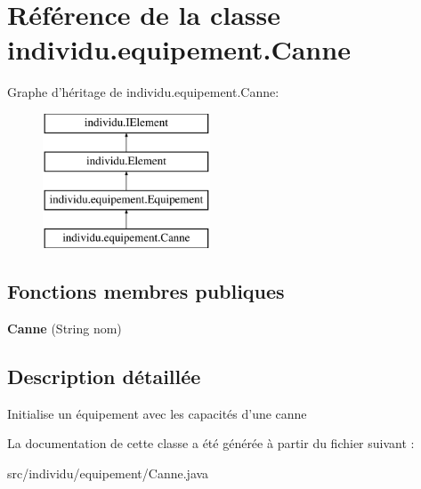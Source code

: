 \hypertarget{classindividu_1_1equipement_1_1_canne}{\section{Référence de la classe individu.\-equipement.\-Canne}
\label{classindividu_1_1equipement_1_1_canne}
}
Graphe d'héritage de individu.\-equipement.\-Canne\-:\begin{figure}[H]
\begin{center}
\leavevmode
\includegraphics[height=4.000000cm]{classindividu_1_1equipement_1_1_canne}
\end{center}
\end{figure}
\subsection*{Fonctions membres publiques}
\begin{DoxyCompactItemize}
\item 
\hypertarget{classindividu_1_1equipement_1_1_canne_a0932a1ff5435367acb523544f221c78c}{{\bfseries Canne} (String nom)}\label{classindividu_1_1equipement_1_1_canne_a0932a1ff5435367acb523544f221c78c}

\end{DoxyCompactItemize}


\subsection{Description détaillée}
Initialise un équipement avec les capacités d'une canne 

La documentation de cette classe a été générée à partir du fichier suivant \-:\begin{DoxyCompactItemize}
\item 
src/individu/equipement/Canne.\-java\end{DoxyCompactItemize}
